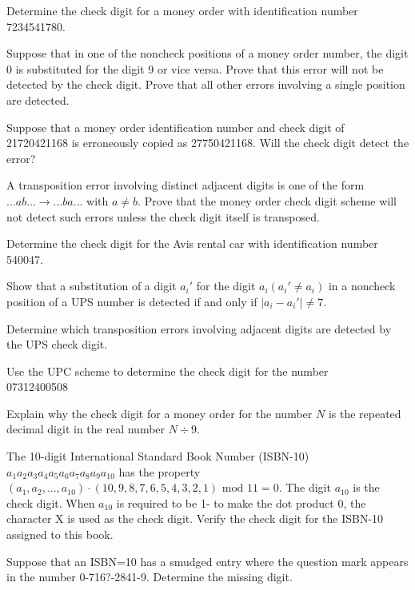 \documentclass[11pt,largemargins]{homework}
\begin{document}
\question 
Determine the check digit for a money order with identification number 7234541780.

\question 
Suppose that in one of the noncheck positions of a money order number, the digit 0 is substituted for the digit 9 or vice versa.
Prove that this error will not be detected by the check digit. Prove that all other errors involving a single position 
are detected.

\question 
Suppose that a money order identification number and check digit of \\21720421168 is erroneously copied as 27750421168. 
Will the check digit detect the error?

\question 
A transposition error involving distinct adjacent digits is one of the form $...ab...\rightarrow...ba...$ with $a\neq b$. 
Prove that the money order check digit scheme will not detect such errors unless the check digit itself is transposed. 

\question 
Determine the check digit for the Avis rental car with identification number 540047.

\question 
Show that a substitution of a digit $a_i'$ for the digit $a_i(a_i'\neq a_i)$ in a noncheck position of a UPS number is 
detected if and only if $|a_i-a_i'|\neq 7$.

\question 
Determine which transposition errors involving adjacent digits are detected by the UPS check digit.

\question 
Use the UPC scheme to determine the check digit for the number\\ 07312400508

\question 
Explain why the check digit for a money order for the number $N$ is the repeated decimal digit in the real 
number $N\div 9$.

\question 
The 10-digit International Standard Book Number (ISBN-10)\\ $a_1a_2a_3a_4a_5a_6a_7a_8a_9a_{10}$ has the property \\
$(a_1, a_2, ..., a_{10})\cdot (10,9,8,7,6,5,4,3,2,1)\text{ mod }11=0$. The digit $a_{10}$ is the check digit. 
When $a_{10}$ is required to be 1- to make the dot product 0, the character X is used as the check digit.
Verify the check digit for the ISBN-10 assigned to this book.

\question 
Suppose that an ISBN=10 has a smudged entry where the question mark appears in the number 0-716?-2841-9.
Determine the missing digit.
\end{document}
